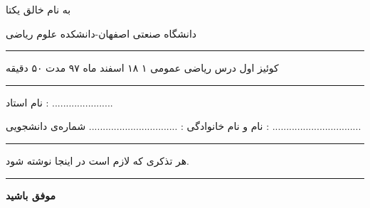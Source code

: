 \documentclass{article}
\begin{document}
{\bf 
\begin{center}          %
{ \huge به نام خالق یکتا}

{ \Large دانشگاه صنعتی اصفهان-دانشکده علوم ریاضی}

\vspace{0.5cm}
\hrule height .5mm
\vspace{0.5cm}

{\large       
کوئیز اول درس ریاضی عمومی ۱     
    \hspace{0.7cm} 
    ۱۸ اسفند ماه ۹۷
    \hspace{0.7cm}
  مدت ۵۰ دقیقه

  }
  
\vspace{0.5cm}
\hrule height .5mm
\vspace{0.5cm}

{\large نام استاد :
 ......................}
\vspace{0.5cm}

{\large نام و نام خانوادگی : 
................................}
{\large شماره‌ی  دانشجویی 
  : ................................}
\end{center}

\vspace{5mm}

\hrule height .5mm
\vskip 2mm

هر تذکری که لازم است در اینجا نوشته شود.

\vskip 2mm
\hrule height .5mm
\vspace{0.3cm}


 
\vspace*{2mm}

\centerline{ {\Large\bf موفق باشید}}
}
\end{document}
